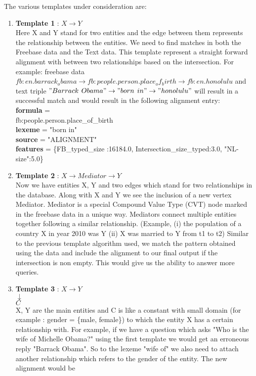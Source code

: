 \documentclass[12pt, a4paper]{article}
\begin{document}
The various templates under consideration are:
\begin{enumerate}
	\item {\bf Template 1} : $X\rightarrow Y$\\
	Here X and Y stand for two entities and the edge between them represents the relationship between the entities. We need to find matches in both the Freebase data and the Text data. This template represent a straight forward alignment with between two relationships based on the intersection. For example: freebase data $fb:en.barrack_obama \rightarrow	fb:people.person.place_of_birth \rightarrow	fb:en.honolulu$ and text triple $"Barrack$ $Obama" \rightarrow "born$ $in" \rightarrow "honolulu"$ will result in a successful match and would result in the following alignment entry:\\
	
{\bf formula} =\\
fb:people.person.place\_of\_birth\\
{\bf lexeme} = "born in"\\
{\bf source} = "ALIGNMENT"\\
{\bf features} = \{FB\_typed\_size :16184.0, Intersection\_size\_typed:3.0, "NL-size":5.0\}


 
	\item {\bf Template 2} : $X\rightarrow Mediator \rightarrow Y$\\
	Now we have entities X, Y and two edges which stand for two relationships in the database. Along with X and Y we see the inclusion of a new vertex Mediator. Mediator is a special Compound Value Type (CVT) node marked in the freebase data in a unique way. Mediators connect multiple entities together following a similar relationship. (Example, (i) the population of a country X in year 2010 was Y (ii) X was married to Y from t1 to t2) Similar to the previous template algorithm used, we match the pattern obtained using the data and include the alignment to our final output if the intersection is non empty. This would give us the ability to answer more queries. 
	
	\item {\bf Template 3} : $X\rightarrow Y$\\
	 $\downarrow$\\
	 $C$\\
	X, Y are the main entities and C is like a constant with small domain (for example : gender = \{male, female\}) to which the entity X has a certain relationship with. For example, if we have a question which asks "Who is the wife of Michelle Obama?" using the first template we would get an erroneous reply "Barrack Obama". So to the lexeme "wife of" we also need to attach another relationship which refers to the gender of the entity. The new alignment would be\\
	

\end{enumerate}
\end{document}
